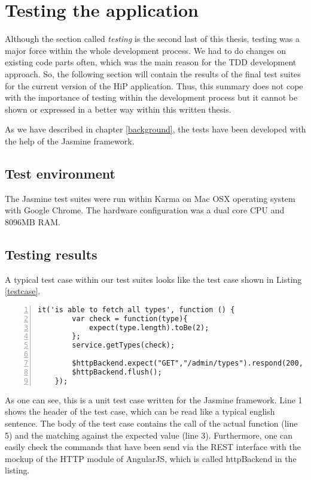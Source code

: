 \chapter[Testing the application]{Testing the application}
Although the section called \textit{testing} is the second last of this thesis, testing was a major force within the whole development process. We had to do changes on existing code parts often, which was the main reason for the \ac{TDD} development approach. So, the following section will contain the results of the final test suites for the current version of the HiP application. Thus, this summary does not cope with the importance of testing within the development process but it cannot be shown or expressed in a better way within this written thesis. 

As we have described in chapter \ref{background}, the tests have been developed with the help of the Jasmine framework.
  
\section{Test environment}
The Jasmine test suites were run within Karma on Mac OSX operating system with Google Chrome. The hardware configuration was a dual core \ac{CPU} and 8096MB \ac{RAM}.

\section{Testing results}
A typical test case within our test suites looks like the test case shown in Listing \ref{testcase}. 

\begin{lstlisting}[numbers=left,caption={Simple test case for the type service},label=testcase,frame=tlbr,breaklines]
    it('is able to fetch all types', function () {
        var check = function(type){
            expect(type.length).toBe(2);
        };
        service.getTypes(check);

        $httpBackend.expect("GET","/admin/types").respond(200, typeList);
        $httpBackend.flush();
    });
\end{lstlisting}

As one can see, this is a unit test case written for the Jasmine framework. Line 1 shows the header of the test case, which can be read like a typical english sentence. The body of the test case contains the call of the actual function (line 5) and the matching against the expected value (line 3). Furthermore, one can easily check the commands that have been send via the \ac{REST} interface with the mockup of the \ac{HTTP} module of AngularJS, which is called httpBackend in the listing.

